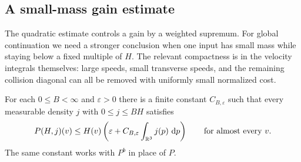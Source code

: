 \subsection{A small-mass gain estimate}

The quadratic estimate controls a gain by a weighted supremum. For
global continuation we need a stronger conclusion when one input has
small mass while staying below a fixed multiple of $H$. The relevant
compactness is in the velocity integrals themselves: large speeds,
small transverse speeds, and the remaining collision diagonal can
all be removed with uniformly small normalized cost.

\begin{lemma}
\label{lem:gain-small-mass}
For each $0\leq B<\infty$ and $\varepsilon>0$ there is a finite
constant $C_{B,\varepsilon}$ such that every measurable density $j$
with $0\leq j\leq BH$ satisfies
\begin{equation}\label{ker:gain-small-mass}
 P(H,j)(v)\leq H(v)
 \left(\varepsilon+C_{B,\varepsilon}
                         \int_{\mathbb R^3}j(p)\,\,\mathrm d p\right)
 \qquad\hbox{for almost every }v.
\end{equation}
The same constant works with $P^b$ in place of $P$.
\end{lemma}

